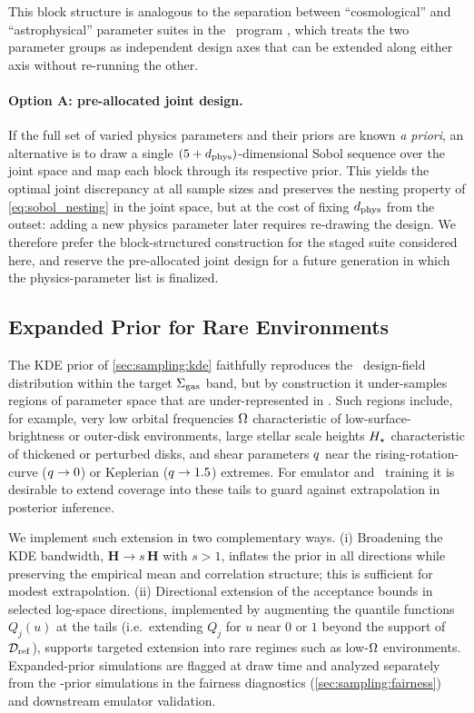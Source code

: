 This block structure is analogous to the separation between
``cosmological'' and ``astrophysical'' parameter suites in the \CAMELS\
program \citep{2021ApJ...915...71V}, which treats the two parameter
groups as independent design axes that can be extended along either axis
without re-running the other.

\paragraph{Option A: pre-allocated joint design.}
If the full set of varied physics parameters and their priors are known
\emph{a priori}, an alternative is to draw a single
$(5+d_{\rm phys})$-dimensional Sobol sequence over the joint space and
map each block through its respective prior. This yields the optimal
joint discrepancy at all sample sizes and preserves the nesting property
of \autoref{eq:sobol_nesting} in the joint space, but at the cost of
fixing $d_{\rm phys}$ from the outset: adding a new physics parameter
later requires re-drawing the design. We therefore prefer the
block-structured construction for the staged suite considered here, and
reserve the pre-allocated joint design for a future generation in which
the physics-parameter list is finalized.

\subsection{Expanded Prior for Rare Environments}
\label{sec:sampling:expanded}

The KDE prior of \autoref{sec:sampling:kde} faithfully reproduces the
\PHANGS\ design-field distribution within the target $\Sigma_{\rm gas}$ band, but
by construction it under-samples regions of parameter space that are
under-represented in \PHANGS. Such regions include, for example, very
low orbital frequencies $\Omega$ characteristic of low-surface-brightness
or outer-disk environments, large stellar scale heights $H_\star$
characteristic of thickened or perturbed disks, and shear parameters
$q$ near the rising-rotation-curve ($q \to 0$) or Keplerian
($q \to 1.5$) extremes. For emulator and \SBI\ training it is
desirable to extend coverage into these tails to guard against
extrapolation in posterior inference.

We implement such extension in two complementary ways. (i) Broadening
the KDE bandwidth, $\bm{H} \to s\,\bm{H}$ with $s > 1$, inflates the
prior in all directions while preserving the empirical mean and
correlation structure; this is sufficient for modest extrapolation.
(ii) Directional extension of the acceptance bounds in selected
log-space directions, implemented by augmenting the quantile functions
$Q_j(u)$ at the tails (i.e.\ extending $Q_j$ for $u$ near $0$ or $1$
beyond the support of $\mathcal{D}_{\rm ref}$), supports targeted extension into rare
regimes such as low-$\Omega$ environments. Expanded-prior simulations
are flagged at draw time and analyzed separately from the
\PHANGS-prior simulations in the fairness diagnostics
(\autoref{sec:sampling:fairness}) and downstream emulator validation.

